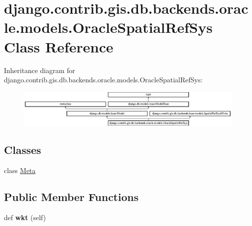 \hypertarget{classdjango_1_1contrib_1_1gis_1_1db_1_1backends_1_1oracle_1_1models_1_1_oracle_spatial_ref_sys}{}\section{django.\+contrib.\+gis.\+db.\+backends.\+oracle.\+models.\+Oracle\+Spatial\+Ref\+Sys Class Reference}
\label{classdjango_1_1contrib_1_1gis_1_1db_1_1backends_1_1oracle_1_1models_1_1_oracle_spatial_ref_sys}
Inheritance diagram for django.\+contrib.\+gis.\+db.\+backends.\+oracle.\+models.\+Oracle\+Spatial\+Ref\+Sys\+:\begin{figure}[H]
\begin{center}
\leavevmode
\includegraphics[height=1.862012cm]{classdjango_1_1contrib_1_1gis_1_1db_1_1backends_1_1oracle_1_1models_1_1_oracle_spatial_ref_sys}
\end{center}
\end{figure}
\subsection*{Classes}
\begin{DoxyCompactItemize}
\item 
class \mbox{\hyperlink{classdjango_1_1contrib_1_1gis_1_1db_1_1backends_1_1oracle_1_1models_1_1_oracle_spatial_ref_sys_1_1_meta}{Meta}}
\end{DoxyCompactItemize}
\subsection*{Public Member Functions}
\begin{DoxyCompactItemize}
\item 
\mbox{\label{classdjango_1_1contrib_1_1gis_1_1db_1_1backends_1_1oracle_1_1models_1_1_oracle_spatial_ref_sys_a33a4d6d15ef9343433e22b0e054fbbb9}} 
def {\bfseries wkt} (self)
\end{DoxyCompactItemize}
